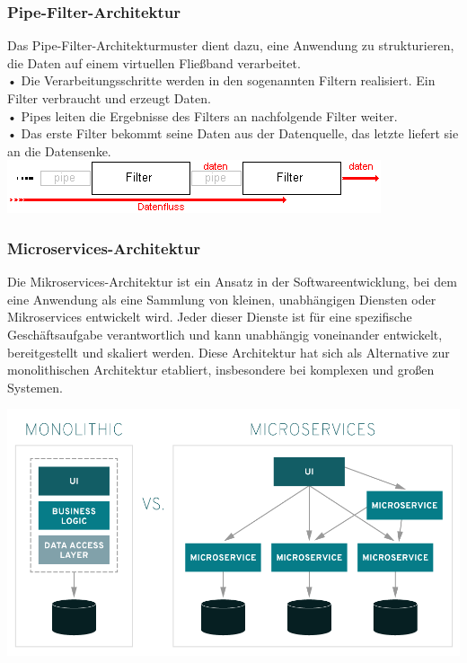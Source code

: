 \documentclass{article}
\begin{document}
\begin{enumerate}[label=\alph*)]
   \subsubsection*{Pipe-Filter-Architektur}
   Das Pipe-Filter-Architekturmuster dient dazu, eine Anwendung zu strukturieren, die Daten auf einem
virtuellen Fließband verarbeitet.\\
   • Die Verarbeitungsschritte werden in den sogenannten Filtern realisiert. Ein Filter verbraucht und erzeugt
Daten.\\
   • Pipes leiten die Ergebnisse des Filters an nachfolgende Filter weiter.\\
   • Das erste Filter bekommt seine Daten aus der Datenquelle, das letzte liefert sie an die Datensenke. \\
   
   \includegraphics[scale=0.6]{media/PipesFilters.png}
   
   
   \subsubsection*{Microservices-Architektur}
   Die Mikroservices-Architektur ist ein Ansatz in der Softwareentwicklung, bei dem eine Anwendung als eine Sammlung von kleinen, unabhängigen Diensten oder Mikroservices entwickelt wird. Jeder dieser Dienste ist für eine spezifische Geschäftsaufgabe verantwortlich und kann unabhängig voneinander entwickelt, bereitgestellt und skaliert werden. Diese Architektur hat sich als Alternative zur monolithischen Architektur etabliert, insbesondere bei komplexen und großen Systemen.
   
   \includegraphics[scale=0.3]{media/microArch.png}


\end{enumerate}
\end{document}
